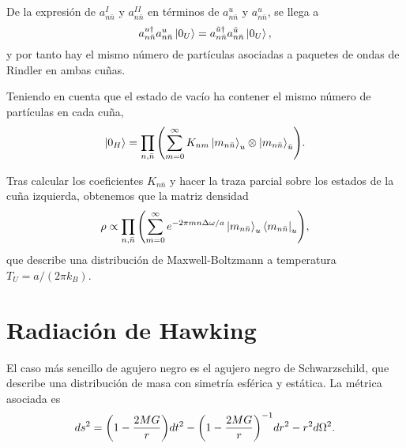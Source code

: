 De la expresión de $a_{n\bar n}^I$ y $a_{n\bar n}^{II}$ en términos de $a_{n\bar n}^u$ y $a_{n\bar n}^u$, se llega a 
\begin{equation}
  a_{n\bar n}^{u\dagger} a_{n\bar n}^u \ket{0_U} = a_{n\bar n}^{\tilde u\dagger}a_{n\bar n}^{\tilde u} \ket{0_U},
\end{equation}
y por tanto hay el mismo número de partículas asociadas a paquetes de ondas de Rindler en ambas
cuñas.

Teniendo en cuenta que el estado de vacío ha contener el mismo número de partículas en cada cuña,
\begin{equation}
  \ket{0_H} = \prod_{n,\bar n} \qty(\sum_{m=0}^\infty K_{nm} \ket{m_{n\bar n}}_u\otimes \ket{m_{n\bar n}}_{\bar u}).
\end{equation}



Tras calcular los coeficientes $K_{n \bar n}$ y hacer la traza parcial sobre los estados de
la cuña izquierda, obtenemos que la matriz densidad
\begin{equation}
  \rho  \propto \prod_{n,\bar n} \qty(\sum_{m=0}^\infty e^{-2\pi m n\Delta  \omega/a}\ket{m_{n\bar n}}_u \bra{m_{n\bar n}}_u),
\end{equation}
que describe una distribución de Maxwell-Boltzmann a temperatura $T_U=a/(2\pi k_B)$.




\section{Radiación de Hawking}

El caso más sencillo de agujero negro es el agujero negro de Schwarzschild, que
describe una distribución de masa con simetría esférica y estática. La métrica asociada
es 
\begin{equation}
  ds^2= \qty(1-\frac{2MG}{r})dt^2-\qty(1-\frac{2MG}{r})^{-1}dr^2-r^2d\Omega^2.
\end{equation}

